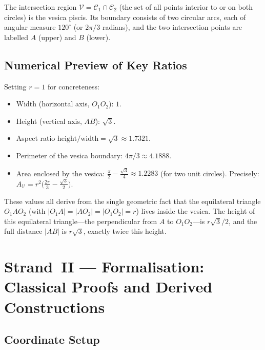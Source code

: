 The intersection region
\(\mathcal{V} = \mathcal{C}_1 \cap \mathcal{C}_2\)
(the set of all points interior to or on both circles) is the vesica
piscis.
Its boundary consists of two circular arcs, each of angular measure
\(120^\circ\) (or \(2\pi/3\) radians), and the two intersection points
are labelled \(A\) (upper) and \(B\) (lower).

\subsection{Numerical Preview of Key Ratios}
\label{subsec:ch11-ratios-preview}

Setting \(r=1\) for concreteness:

\begin{itemize}
\item Width (horizontal axis, \(O_1 O_2\)): \(1\).
\item Height (vertical axis, \(AB\)): \(\sqrt{3}\).
\item Aspect ratio \(\text{height}/\text{width} = \sqrt{3} \approx 1.7321\).
\item Perimeter of the vesica boundary: \(4\pi/3 \approx 4.1888\).
\item Area enclosed by the vesica:
      \(\tfrac{\pi}{2} - \tfrac{\sqrt{3}}{4} \approx 1.2283\) (for two unit circles).
      Precisely: \(A_{\mathcal{V}} = r^2 \bigl(\tfrac{2\pi}{3} - \tfrac{\sqrt{3}}{2}\bigr)\).
\end{itemize}

These values all derive from the single geometric fact that the equilateral
triangle \(O_1 A O_2\) (with \(|O_1 A| = |A O_2| = |O_1 O_2| = r\)) lives
inside the vesica.
The height of this equilateral triangle—the perpendicular from \(A\) to
\(O_1 O_2\)—is \(r\sqrt{3}/2\), and the full distance \(|AB|\) is
\(r\sqrt{3}\), exactly twice this height.

\section{Strand~II --- Formalisation: Classical Proofs and Derived Constructions}
\label{sec:ch11-strand2}

\subsection{Coordinate Setup}
\label{subsec:ch11-coords}

